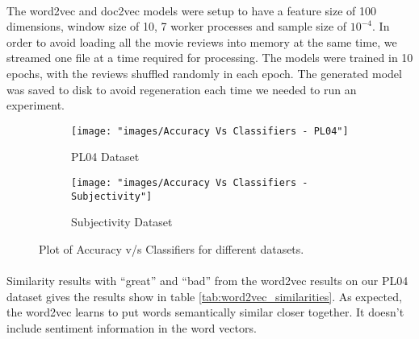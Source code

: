 \documentclass[a4paper,26pt]{article}
\begin{document}
\paragraph{}
The word2vec and doc2vec models were setup to have a feature size of 100 dimensions, window size of 10, 7 worker processes and sample size of $10^{-4}$. In order to avoid loading all the movie reviews into memory at the same time, we streamed one file at a time required for processing. The models were trained in 10 epochs, with the reviews shuffled randomly in each epoch. The generated model was saved to disk to avoid regeneration each time we needed to run an experiment. 

\begin{figure}[H]
    \centering
    \begin{subfigure}[b]{0.45\textwidth}
        \centering
        \texttt{[image: "images/Accuracy Vs Classifiers - PL04"]}
        \caption{PL04 Dataset}
    \end{subfigure}
    \hfill
    \begin{subfigure}[b]{0.45\textwidth}
        \centering
        \texttt{[image: "images/Accuracy Vs Classifiers - Subjectivity"]}
        \caption{Subjectivity Dataset}
    \end{subfigure}
    \caption{Plot of Accuracy v/s Classifiers for different datasets.}
    \label{fig:accuracyplot}
\end{figure}

\paragraph{}
Similarity results with ``great'' and ``bad'' from the word2vec results on our PL04 dataset gives the results show in table \ref{tab:word2vec_similarities}. As expected, the word2vec learns to put words semantically similar closer together. It doesn't include sentiment information in the word vectors. 
\end{document}

